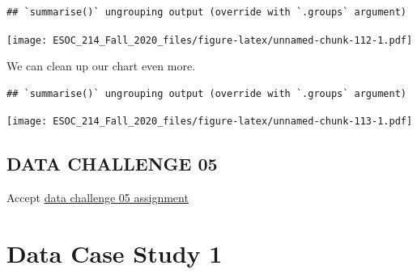 \documentclass[
]{book}
\newenvironment{Shaded}{\begin{snugshade}}{\end{snugshade}}
\newcommand{\DataTypeTok}[1]{\textcolor[rgb]{0.13,0.29,0.53}{#1}}
\newcommand{\DecValTok}[1]{\textcolor[rgb]{0.00,0.00,0.81}{#1}}
\newcommand{\KeywordTok}[1]{\textcolor[rgb]{0.13,0.29,0.53}{\textbf{#1}}}
\newcommand{\NormalTok}[1]{#1}
\newcommand{\OperatorTok}[1]{\textcolor[rgb]{0.81,0.36,0.00}{\textbf{#1}}}
\newcommand{\StringTok}[1]{\textcolor[rgb]{0.31,0.60,0.02}{#1}}
\begin{document}
\begin{verbatim}
## `summarise()` ungrouping output (override with `.groups` argument)
\end{verbatim}

\texttt{[image: ESOC\_214\_Fall\_2020\_files/figure-latex/unnamed-chunk-112-1.pdf]}

We can clean up our chart even more.

\begin{Shaded}
\end{Shaded}

\begin{verbatim}
## `summarise()` ungrouping output (override with `.groups` argument)
\end{verbatim}

\texttt{[image: ESOC\_214\_Fall\_2020\_files/figure-latex/unnamed-chunk-113-1.pdf]}

\hypertarget{data-challenge-05}{%
\section{DATA CHALLENGE 05}\label{data-challenge-05}}

Accept \href{}{data challenge 05 assignment}

\hypertarget{data-case-study-1}{%
\chapter{Data Case Study 1}\label{data-case-study-1}}
\end{document}
